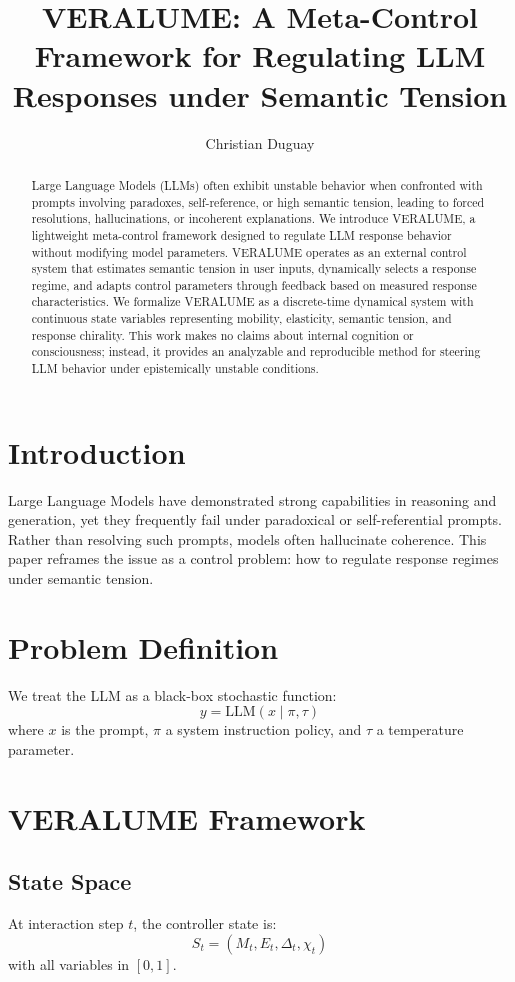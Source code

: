 \documentclass[11pt]{article}
\title{VERALUME: A Meta-Control Framework for Regulating LLM Responses under Semantic Tension}
\author{Christian Duguay}
\date{}
\begin{document}
\maketitle

\begin{abstract}
Large Language Models (LLMs) often exhibit unstable behavior when confronted with prompts involving paradoxes, self-reference, or high semantic tension, leading to forced resolutions, hallucinations, or incoherent explanations. We introduce VERALUME, a lightweight meta-control framework designed to regulate LLM response behavior without modifying model parameters. VERALUME operates as an external control system that estimates semantic tension in user inputs, dynamically selects a response regime, and adapts control parameters through feedback based on measured response characteristics. We formalize VERALUME as a discrete-time dynamical system with continuous state variables representing mobility, elasticity, semantic tension, and response chirality. This work makes no claims about internal cognition or consciousness; instead, it provides an analyzable and reproducible method for steering LLM behavior under epistemically unstable conditions.
\end{abstract}

\section{Introduction}
Large Language Models have demonstrated strong capabilities in reasoning and generation, yet they frequently fail under paradoxical or self-referential prompts. Rather than resolving such prompts, models often hallucinate coherence. This paper reframes the issue as a control problem: how to regulate response regimes under semantic tension.

\section{Problem Definition}
We treat the LLM as a black-box stochastic function:
\[
y = \text{LLM}(x \mid \pi, \tau)
\]
where $x$ is the prompt, $\pi$ a system instruction policy, and $\tau$ a temperature parameter.

\section{VERALUME Framework}
\subsection{State Space}
At interaction step $t$, the controller state is:
\[
S_t = (M_t, E_t, \Delta_t, \chi_t)
\]
with all variables in $[0,1]$.
\end{document}
